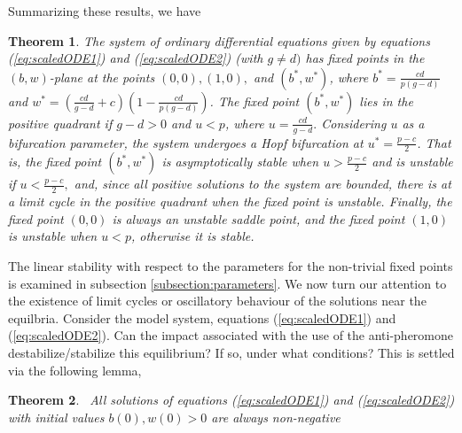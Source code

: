 \documentclass[review,authoryear]{elsarticle}
\newtheorem{theorem}{Theorem}[section]
\begin{document}
Summarizing these results, we have

\begin{theorem}
  The system of ordinary differential equations given by equations (\ref{eq:scaledODE1}) and (\ref{eq:scaledODE2}) (with $g\ne d)$ has fixed points in the $(b,w)$-plane at the points $(0,0), (1,0),$ and $(b^*,w^*)$, where $b^*=\frac{cd}{p(g-d)}$ and
$w^*=\left(\frac{cd}{g-d}+c\right)\left(1-\frac{cd}{p(g-d)}\right)$. 
 The  fixed point $(b^*,w^*)$ lies in the positive quadrant if $g-d>0$ and $u<p$, where $u=\frac{cd}{g-d}.$ Considering $u$ as a bifurcation parameter, the system undergoes a Hopf bifurcation at $u^* = \frac{p-c}{2}$.  
That is, the fixed point $(b^*,w^*)$ is asymptotically stable when $u>\frac{p-c}{2}$ and is unstable if $u<\frac{p-c}{2},$ and, since all positive solutions to the system are bounded,  there is at a  limit cycle in the positive quadrant when the fixed point is unstable.
Finally, the fixed point $(0,0)$ is always an unstable saddle point, and the fixed point $(1,0)$ is unstable when $u<p$, otherwise it is stable.
\end{theorem}

\label{appendix:stability}


\iffalse

The linear stability with respect to the parameters for the
non-trivial fixed points is examined in subsection 
\ref{subsection:parameters}. We now turn our attention to the
existence of limit cycles or oscillatory behaviour of the solutions
near the equilbria. Consider the model system, equations
(\ref{eq:scaledODE1}) and (\ref{eq:scaledODE2}). Can the impact
associated with the use of the anti-pheromone destabilize/stabilize
this equilibrium? If so, under what conditions? This is settled via
the following lemma,
\begin{theorem}
  \bigskip\ All solutions of equations (\ref{eq:scaledODE1}) and
  (\ref{eq:scaledODE2}) with initial values
  $b\left( 0\right) ,w\left( 0\right) >0$ are always non-negative
\end{theorem}
\end{document}

